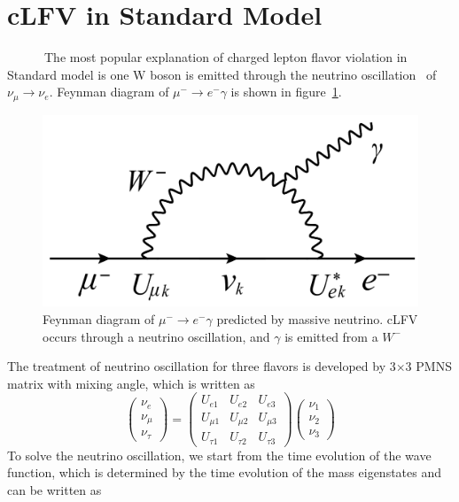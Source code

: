 \section{cLFV in Standard Model}
~~~~~~The most popular explanation of charged lepton flavor violation in Standard model is one W boson is emitted through the neutrino oscillation~\cite{t2k} of $\nu_\mu \rightarrow \nu_e$.
Feynman diagram of $\mu^- \rightarrow e^-\gamma$ is shown in figure~\ref{muefy}.
\begin{figure}[H]
 \centering
 \includegraphics[scale=0.27]{chapter1/fig/SMmue.pdf}
 \caption{Feynman diagram of $\mu^- \rightarrow e^-\gamma$ predicted by massive neutrino. cLFV occurs through a neutrino oscillation, and $\gamma$ is emitted from a $W^-$}
 \label{muefy}
\end{figure}
The treatment of neutrino oscillation for three flavors is developed by 3$\times$3 PMNS matrix with mixing angle, which is written as
\begin{equation}
 \begin{pmatrix}
  \nu_e \\
  \nu_\mu \\
  \nu_\tau
 \end{pmatrix} = \begin{pmatrix}
  U_{e1} & U_{e2} & U_{e3} \\
  U_{\mu1} & U_{\mu2} & U_{\mu3} \\
  U_{\tau1} & U_{\tau2} & U_{\tau3}
 \end{pmatrix} \begin{pmatrix}
  \nu_1 \\
  \nu_2 \\
  \nu_3
 \end{pmatrix}
\end{equation}
To solve the neutrino oscillation, we start from the time evolution of the wave function, which is determined by the time evolution of the mass eigenstates and can be written as
